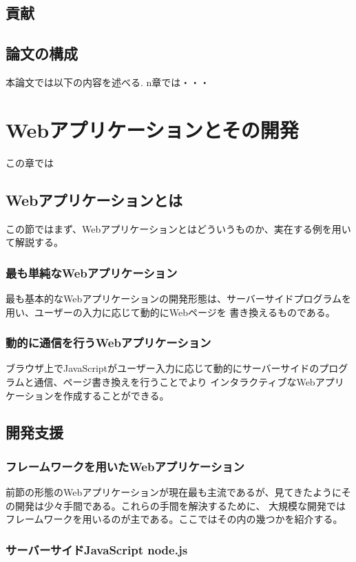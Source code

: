 \documentclass[a4j,12pt]{jreport}
\begin{document}
\section{貢献}

\section{論文の構成}
 本論文では以下の内容を述べる.
 n章では・・・

\chapter{Webアプリケーションとその開発}
この章では
\section{Webアプリケーションとは}
この節ではまず、Webアプリケーションとはどういうものか、実在する例を用いて解説する。

\subsection{最も単純なWebアプリケーション}
最も基本的なWebアプリケーションの開発形態は、サーバーサイドプログラムを用い、ユーザーの入力に応じて動的にWebページを
書き換えるものである。

\subsection{動的に通信を行うWebアプリケーション}
ブラウザ上でJavaScriptがユーザー入力に応じて動的にサーバーサイドのプログラムと通信、ページ書き換えを行うことでより
インタラクティブなWebアプリケーションを作成することができる。


\section{開発支援}
\subsection{フレームワークを用いたWebアプリケーション}
前節の形態のWebアプリケーションが現在最も主流であるが、見てきたようにその開発は少々手間である。これらの手間を解決するために、
大規模な開発ではフレームワークを用いるのが主である。ここではその内の幾つかを紹介する。

\subsection{サーバーサイドJavaScript node.js}
\end{document}
